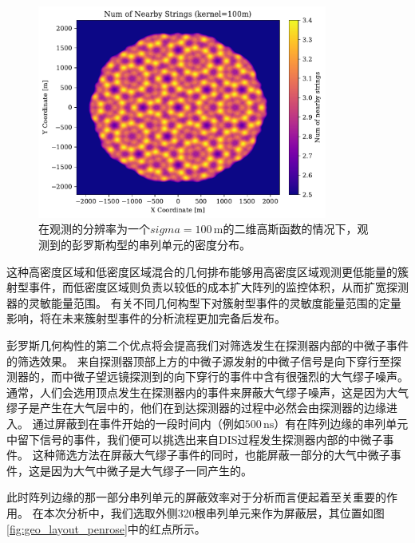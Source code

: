\begin{figure}[!htb]%
    \centering
    \includegraphics[width=0.85\textwidth]{img/string_density_penrose.pdf}
    \caption{在观测的分辨率为一个$sigma = 100\,\mathrm{m}$的二维高斯函数的情况下，观测到的彭罗斯构型的串列单元的密度分布。}
    \label{fig:string_density_penrose}
\end{figure}

这种高密度区域和低密度区域混合的几何排布能够用高密度区域观测更低能量的簇射型事件，而低密度区域则负责以较低的成本扩大阵列的监控体积，从而扩宽探测器的灵敏能量范围。
有关不同几何构型下对簇射型事件的灵敏度能量范围的定量影响，将在未来簇射型事件的分析流程更加完备后发布。

彭罗斯几何构性的第二个优点将会提高我们对筛选发生在探测器内部的中微子事件的筛选效果。
来自探测器顶部上方的中微子源发射的中微子信号是向下穿行至探测器的，而中微子望远镜探测到的向下穿行的事件中含有很强烈的大气缪子噪声。
通常，人们会选用顶点发生在探测器内的事件来屏蔽大气缪子噪声，这是因为大气缪子是产生在大气层中的，他们在到达探测器的过程中必然会由探测器的边缘进入。
通过屏蔽到在事件开始的一段时间内（例如$500\,\mathrm{ns}$）有在阵列边缘的串列单元中留下信号的事件，我们便可以挑选出来自DIS过程发生探测器内部的中微子事件\cite{IceCube_HESE:2020}。
这种筛选方法在屏蔽大气缪子事件的同时，也能屏蔽一部分的大气中微子事件\cite{IceCube_starting_track:2021}，这是因为大气中微子是大气缪子一同产生的。

此时阵列边缘的那一部分串列单元的屏蔽效率对于分析而言便起着至关重要的作用。
在本次分析中，我们选取外侧320根串列单元来作为屏蔽层，其位置如图\ref{fig:geo_layout_penrose}中的红点所示。

